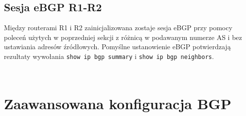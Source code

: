 \documentclass[a4paper,12pt,notitlepage]{article}
\begin{document}
\subsection{Sesja eBGP R1-R2}
Między routerami R1 i R2 zainicjalizowana zostaje sesja eBGP przy pomocy poleceń użytych w poprzedniej sekcji z różnicą w podawanym numerze AS i bez ustawiania adresów źródłowych. Pomyślne ustanowienie eBGP potwierdzają rezultaty wywołania \texttt{show ip bgp summary} i \texttt{show ip bgp neighbors}.
\inputminted[label=Rezultat polecenia show ip bgp summary na R1, firstline=123, lastline=128]{text}{Routers/R1.txt}
\inputminted[label=Rezultat polecenia show ip bgp summary na R2, firstline=321, lastline=327]{text}{Routers/R2.txt}
\section{Zaawansowana konfiguracja BGP}
\end{document}
